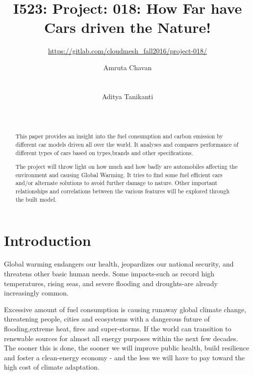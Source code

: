 \documentclass{acm_proc_article-sp}
\begin{document}
\setlength{\emergencystretch}{3em}

\title{I523: Project: 018: How Far have Cars driven the Nature!}

\subtitle{\url{https://gitlab.com/cloudmesh_fall2016/project-018/}}

\author{
\alignauthor
Amruta Chavan\\
       \\
       \\
\alignauthor
Aditya Tanikanti\\
       \\
       \\
}
\toappear{}
\maketitle

\begin{abstract}
This paper provides an insight into the fuel consumption and carbon emission by different car models driven all over the world. It analyses and compares performance of different types of cars based on types,brands and other specifications.

The project will throw light on how much and how badly are automobiles affecting the environment and causing Global Warming. It tries to find some fuel efficient cars and/or alternate solutions to avoid further damage to nature. Other important relationships and correlations between the various features will be explored through the built model.

\end{abstract}

\section{Introduction}
Global warming endangers our health, jeopardizes our national security, and threatens other basic human needs. Some impacts-such as record high temperatures, rising seas, and severe flooding and droughts-are already increasingly common.

Excessive amount of fuel consumption is causing runaway global climate change, threatening people, cities and ecosystems with a dangerous future of flooding,extreme heat, fires and super-storms. If the world can transition to renewable sources for almost all energy purposes within the next few decades. The sooner this is done, the sooner we will improve public health, build resilience and foster a clean-energy economy - and the less we will have to pay toward the high cost of climate adaptation.
\end{document}

